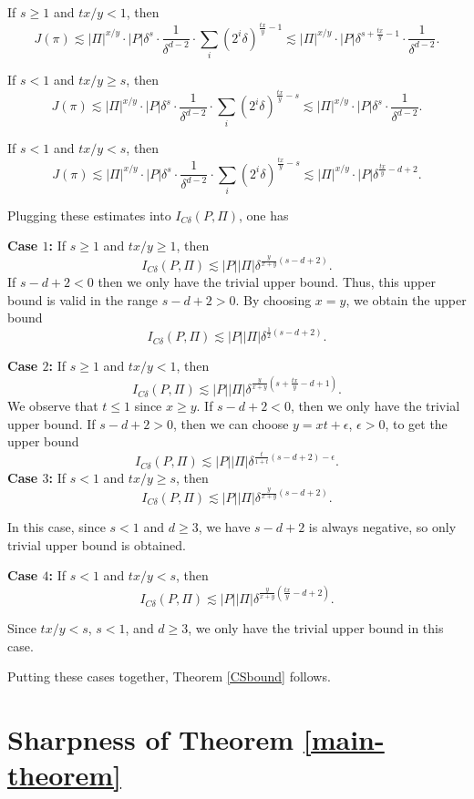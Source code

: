 \documentclass[11pt]{article}
\newcommand{\1}{\mathbf{1}}
\begin{document}
If $s\ge 1$ and $tx/y < 1$, then
\[J(\pi)\lesssim |\Pi|^{x/y} \cdot |P|\delta^{s} \cdot \frac{1}{\delta^{d-2}}\cdot \sum_{i}(2^i\delta)^{\frac{tx}{y}-1}\lesssim |\Pi|^{x/y} \cdot |P|\delta^{s+\frac{tx}{y}-1} \cdot \frac{1}{\delta^{d-2}}.\]


If $s< 1$ and $tx/y\ge s$, then
\[J(\pi)\lesssim |\Pi|^{x/y} \cdot |P|\delta^{s} \cdot \frac{1}{\delta^{d-2}}\cdot \sum_{i}(2^i\delta)^{\frac{tx}{y}-s}\lesssim |\Pi|^{x/y} \cdot |P|\delta^{s} \cdot \frac{1}{\delta^{d-2}}.\]


If $s< 1$ and $tx/y < s$, then
\[J(\pi)\lesssim |\Pi|^{x/y} \cdot |P|\delta^{s} \cdot \frac{1}{\delta^{d-2}}\cdot \sum_{i}(2^i\delta)^{\frac{tx}{y}-s}\lesssim |\Pi|^{x/y} \cdot |P|\delta^{\frac{tx}{y}-d+2}.\]



Plugging these estimates into $I_{C\delta}(P, \Pi)$, one has

    {\bf Case $1$:} If $s\ge 1$ and $tx/y\ge 1$, then
\[I_{C\delta}(P, \Pi)\lesssim |P||\Pi|\delta^{\frac{y}{x+y}\left(s-d+2\right)}.\]
If $s-d+2<0$ then we only have the trivial upper bound. Thus, this upper bound is valid in the range $s-d+2>0$. By choosing $x=y$, we obtain the upper bound
\[I_{C\delta}(P, \Pi) \lesssim |P||\Pi|\delta^{\frac{1}{2}\left(s-d+2\right)}. \]

{\bf Case $2$:} If $s\ge 1$ and $tx/y<1$, then
\[I_{C\delta}(P, \Pi)\lesssim |P||\Pi|\delta^{\frac{y}{x+y}\left(s+\frac{tx}{y}-d+1\right)}.\]
We observe that $t\le 1$ since $x\ge y$. If $s-d+2<0$, then we only have the trivial upper bound. If $s-d+2>0$, then we can choose
$y=xt+\epsilon$, $\epsilon > 0$, to get the upper bound \[I_{C\delta}(P, \Pi)\lesssim |P||\Pi|\delta^{\frac{t}{1+t}\left(s-d+2\right) - \epsilon}.\]
{\bf Case $3$:} If $s< 1$ and $tx/y\ge s$, then
\[I_{C\delta}(P, \Pi)\lesssim |P||\Pi|\delta^{\frac{y}{x+y}\left(s-d+2\right)}.\]

In this case, since $s < 1$ and $d \geq 3$, we have $s-d+2$ is always negative, so only trivial upper bound is obtained.



    {\bf Case $4$:} If $s< 1$ and $tx/y< s$, then
\[I_{C\delta}(P, \Pi)\lesssim |P||\Pi|\delta^{\frac{y}{x+y}\left(\frac{tx}{y}-d+2\right)}.\]

Since $tx/y<s$, $s<1$, and $d\ge 3$, we only have the trivial upper bound in this case.


Putting these cases together, Theorem \ref{CSbound} follows.
\section{Sharpness of Theorem \ref{main-theorem}}
\end{document}
